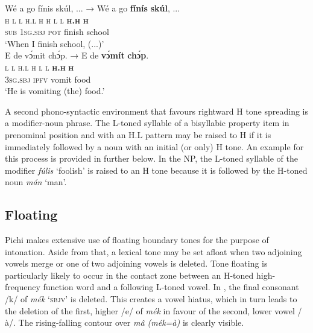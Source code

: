 \ea\label{ex:key:51}
\glll Wé  a    go  fínis    skúl,  \op...\cp{}  →    Wé  a  go  \textbf{f\'inís}  \textbf{skúl},  \op...\cp\\
\textsc{h}  \textsc{l}    \textsc{l}  \textsc{h.l}    \textsc{h}    {}  {}  \textsc{h}  \textsc{l}  \textsc{l}  \textbf{\textsc{h.h}}    \textbf{\textsc{h}}\\
\textsc{sub}  \textsc{1sg.sbj}  \textsc{pot}  finish  school\\
\glt  ‘When I finish school, (...)’\\
\z
\ea\label{ex:key:52}   
\glll E    de    vɔ́mit  chɔ́p.  →  E  de  \textbf{v\'ɔmít}  \textbf{chɔ́p}.\\
\textsc{l}    \textsc{l}    \textsc{h.l}    \textsc{h}    {}    \textsc{l}  \textsc{l}  \textbf{\textsc{h.h}  }  \textbf{\textsc{h}}\\
\textsc{3sg.sbj}  \textsc{ipfv}    vomit  food\\
\glt  ‘He is vomiting (the) food.’\\
\z

A second phono-syntactic environment that favours rightward H tone spreading is a modifier-noun phrase. The L-toned syllable of a bisyllabic property item in prenominal position and with an H.L pattern may be raised to H if it is immediately followed by a noun with an initial (or only) H tone. An example for this process is provided in  further below. In the NP, the L-toned syllable of the modifier \textit{fúlis} ‘foolish’ is raised to an H tone because it is followed by the H-toned noun \textit{mán} ‘man’.

\subsection{Floating}\label{sec:3.2.2}

Pichi makes extensive use of floating boundary tones for the purpose of intonation. Aside from that, a lexical tone may be set afloat when two adjoining vowels merge or one of two adjoining vowels is deleted. Tone floating is particularly likely to occur in the contact zone between an H-toned high-frequency function word and a following L-toned vowel. In , the final consonant /k/ of \textit{mék} ‘\textsc{sbjv}’ is deleted. This creates a vowel hiatus, which in turn leads to the deletion of the first, higher /e/ of \textit{mék} in favour of the second, lower vowel /à/. The rising-falling contour over \textit{mâ (mék=à)} is clearly visible. 



